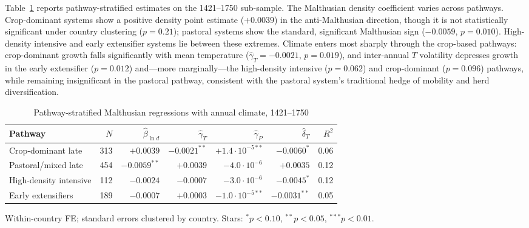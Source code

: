 \documentclass[11pt,letterpaper]{article}
\begin{document}
Table~\ref{tab:malthus} reports pathway-stratified estimates on the 1421--1750 sub-sample. The Malthusian density coefficient varies across pathways. Crop-dominant systems show a positive density point estimate ($+0.0039$) in the anti-Malthusian direction, though it is not statistically significant under country clustering ($p=0.21$); pastoral systems show the standard, significant Malthusian sign ($-0.0059$, $p=0.010$). High-density intensive and early extensifier systems lie between these extremes. Climate enters most sharply through the crop-based pathways: crop-dominant growth falls significantly with mean temperature ($\hat\gamma_T=-0.0021$, $p=0.019$), and inter-annual $T$ volatility depresses growth in the early extensifier ($p=0.012$) and---more marginally---the high-density intensive ($p=0.062$) and crop-dominant ($p=0.096$) pathways, while remaining insignificant in the pastoral pathway, consistent with the pastoral system's traditional hedge of mobility and herd diversification.

\begin{table}[H]
\centering
\caption{Pathway-stratified Malthusian regressions with annual climate, 1421--1750}
\label{tab:malthus}
\small
\begin{tabular}{lrrrrrr}
\toprule
Pathway & $N$ & $\hat{\beta}_{\ln d}$ & $\hat{\gamma}_T$ & $\hat{\gamma}_P$ & $\hat{\delta}_T$ & $R^2$ \\
\midrule
Crop-dominant late      & 313 & $+0.0039$      & $-0.0021^{**}$  & $+1.4{\cdot}10^{-5**}$ & $-0.0060^{*}$   & 0.06 \\
Pastoral/mixed late     & 454 & $-0.0059^{**}$  & $+0.0039$      & $-4.0{\cdot}10^{-6}$   & $+0.0035$       & 0.12 \\
High-density intensive  & 112 & $-0.0024$      & $-0.0007$      & $-3.0{\cdot}10^{-6}$   & $-0.0045^{*}$   & 0.12 \\
Early extensifiers      & 189 & $-0.0007$      & $+0.0003$      & $-1.0{\cdot}10^{-5**}$ & $-0.0031^{**}$  & 0.05 \\
\bottomrule
\end{tabular}
\par\smallskip\footnotesize{Within-country FE; standard errors clustered by country. Stars: $^{*}p<0.10$, $^{**}p<0.05$, $^{***}p<0.01$.}
\end{table}
\end{document}

